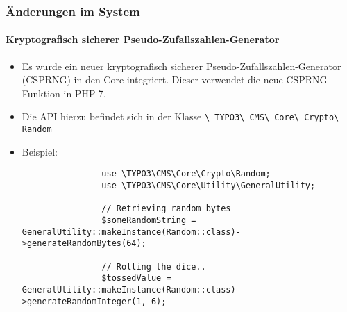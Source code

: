 \begin{frame}[fragile]
	\frametitle{Änderungen im System}
	\framesubtitle{Kryptografisch sicherer Pseudo-Zufallszahlen-Generator}

	\lstset{basicstyle=\tiny\ttfamily}

	\begin{itemize}

		\item Es wurde ein neuer kryptografisch sicherer Pseudo-Zufallszahlen-Generator (CSPRNG) in den Core integriert.\newline
			Dieser verwendet die neue CSPRNG-Funktion in PHP 7.

		\item Die API hierzu befindet sich in der Klasse
			\texttt{\textbackslash
				TYPO3\textbackslash
				CMS\textbackslash
				Core\textbackslash
				Crypto\textbackslash
				Random}

		\item Beispiel:

			\begin{lstlisting}
				use \TYPO3\CMS\Core\Crypto\Random;
				use \TYPO3\CMS\Core\Utility\GeneralUtility;

				// Retrieving random bytes
				$someRandomString = GeneralUtility::makeInstance(Random::class)->generateRandomBytes(64);

				// Rolling the dice..
				$tossedValue = GeneralUtility::makeInstance(Random::class)->generateRandomInteger(1, 6);
			\end{lstlisting}

	\end{itemize}

\end{frame}

